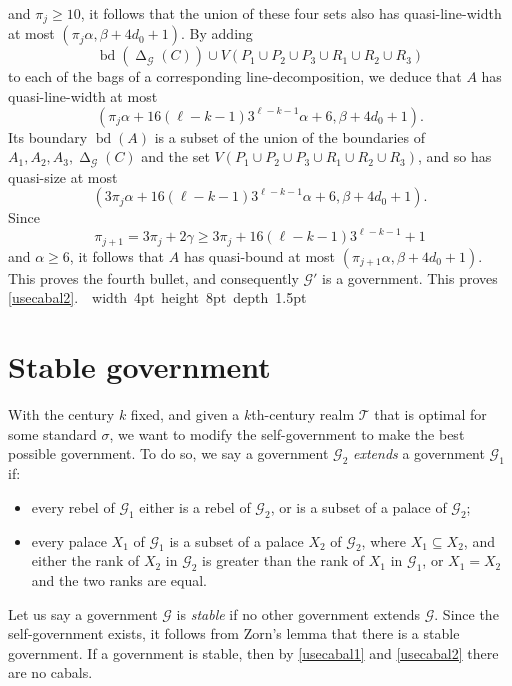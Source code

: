 \documentclass[titlepage,11pt]{article}
\newcommand\blackslug{\hbox{\hskip 1pt \vrule width 4pt height 8pt depth 1.5pt
		\hskip 1pt}}
\newcommand\bbox{\hfill \quad \blackslug \bigbreak}
\newcommand{\voro}{\operatorname{\Delta}}
\newcommand{\bd}{\operatorname{bd}}
\newcommand{\mac}{\mathcal}
\begin{document}
	and $\pi_{j}\ge 10$, 
	it follows that the union of these four sets also has quasi-line-width at most $(\pi_{j}\alpha, \beta+4d_0+1)$.
	By adding 
	$$\bd(\voro_{\mac G}(C))\cup V(P_1\cup P_2\cup P_3\cup R_1\cup R_2\cup R_3)$$
	to each of the bags of a corresponding line-decomposition, we deduce that $A$ has quasi-line-width at most 
	$$(\pi_{j}\alpha+ 16(\ell-k-1)3^{\ell-k-1}\alpha+6, \beta+4d_0+1).$$
	Its boundary $\bd(A)$ is a subset of the union of the boundaries of $A_1, A_2, A_3, \voro_{\mac G}(C)$ and the set
	$V(P_1\cup P_2\cup P_3\cup R_1\cup R_2\cup R_3)$, and so has quasi-size at most
	$$(3\pi_{j}\alpha+ 16(\ell-k-1)3^{\ell-k-1}\alpha+6, \beta+4d_0+1).$$
	Since 
	$$\pi_{j+1}= 3\pi_{j}+ 2\gamma \ge 3\pi_{j}+ 16(\ell-k-1)3^{\ell-k-1}+1$$ 
	and $\alpha\ge 6$, it follows that
	$A$ has quasi-bound at most $(\pi_{j+1}\alpha, \beta+4d_0+1)$. 
	This proves the fourth bullet, and consequently
	$\mac G'$ is a government. This proves \ref{usecabal2}.~\bbox
	\section{Stable government}
	
	With the century $k$ fixed, and given a $k$th-century realm $\mac T$ that is optimal for some standard $\sigma$,
	we want to modify the self-government to make the best possible government. To do so, we say a government $\mac G_2$
	{\em extends} a government $\mac G_1$ if:
	\begin{itemize}
		\item every rebel of $\mac G_1$ either is a rebel of $\mac G_2$, or is a subset of a palace of $\mac G_2$;
		\item every palace $X_1$ of $\mac G_1$ is a subset of a palace $X_2$ of $\mac G_2$, where $X_1\subseteq X_2$, and either
		the rank of $X_2$ in $\mac G_2$ is greater than the
		rank of $X_1$ in $\mac G_1$, or $X_1=X_2$ and the two ranks are equal.
	\end{itemize}
	Let us say a government $\mac G$ is {\em stable} if no other government  extends $\mac G$.  Since the  self-government 
	exists, it follows from Zorn's lemma that there is a stable government. If a government is stable, then
	by \ref{usecabal1} and \ref{usecabal2} there are no cabals.
	
\end{document}
